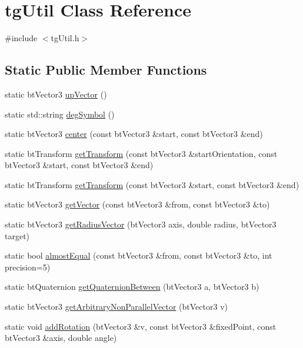 \hypertarget{classtg_util}{\section{tg\-Util Class Reference}
\label{classtg_util}
}


{\ttfamily \#include $<$tg\-Util.\-h$>$}

\subsection*{Static Public Member Functions}
\begin{DoxyCompactItemize}
\item 
static bt\-Vector3 \hyperlink{classtg_util_afae077401a52e6107552a2a725bea425}{up\-Vector} ()
\item 
static std\-::string \hyperlink{classtg_util_ad38211ae877e6f35dacd347bd0705155}{deg\-Symbol} ()
\item 
static bt\-Vector3 \hyperlink{classtg_util_a020dfd813cb828413d2dc75f222763db}{center} (const bt\-Vector3 \&start, const bt\-Vector3 \&end)
\item 
static bt\-Transform \hyperlink{classtg_util_abb5c7f423fc815e9166348995ad0a902}{get\-Transform} (const bt\-Vector3 \&start\-Orientation, const bt\-Vector3 \&start, const bt\-Vector3 \&end)
\item 
static bt\-Transform \hyperlink{classtg_util_ab1e870e2f30f4ce8d1ed67211b9ff658}{get\-Transform} (const bt\-Vector3 \&start, const bt\-Vector3 \&end)
\item 
static bt\-Vector3 \hyperlink{classtg_util_a639b65c79c7d97db692c83da8d40b1c4}{get\-Vector} (const bt\-Vector3 \&from, const bt\-Vector3 \&to)
\item 
static bt\-Vector3 \hyperlink{classtg_util_aed1721ee921b9b09e384282db1ddece4}{get\-Radius\-Vector} (bt\-Vector3 axis, double radius, bt\-Vector3 target)
\item 
static bool \hyperlink{classtg_util_a6a4c7ed9914ab932a5191e3686e04f12}{almost\-Equal} (const bt\-Vector3 \&from, const bt\-Vector3 \&to, int precision=5)
\item 
static bt\-Quaternion \hyperlink{classtg_util_ac30fcd210a6a3c40bae822380cda934a}{get\-Quaternion\-Between} (bt\-Vector3 a, bt\-Vector3 b)
\item 
static bt\-Vector3 \hyperlink{classtg_util_a47c537018d69739ce847be74af3f9223}{get\-Arbitrary\-Non\-Parallel\-Vector} (bt\-Vector3 v)
\item 
static void \hyperlink{classtg_util_a909c25250cd5a52da70c530a64eb7f37}{add\-Rotation} (bt\-Vector3 \&v, const bt\-Vector3 \&fixed\-Point, const bt\-Vector3 \&axis, double angle)

\end{DoxyCompactItemize}

